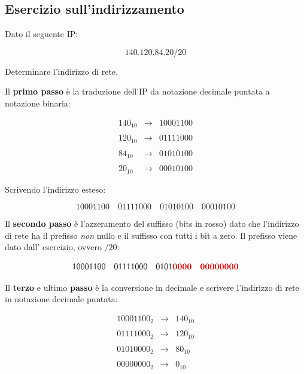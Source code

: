 \documentclass[a4paper]{article}
\newcommand{\binaryaddress}[4]{#1 \hspace{1em} #2 \hspace{1em} #3 \hspace{1em} #4}
\begin{document}
	\newpage
	
	\subsection{\textcolor{Red3}{Esercizio sull'indirizzamento}}
	
	Dato il seguente IP:
	
	\begin{equation*}
		140.120.84.20/20
	\end{equation*}
	
	\noindent
	Determinare l’indirizzo di rete.\newline
	
	\noindent
	Il \textbf{primo passo} è la traduzione dell’IP da notazione decimale puntata a notazione binaria:
	
	\begin{equation*}
		\begin{array}{lll}
			140_{10}	& \longrightarrow & 10001100 \\
			&& \\
			120_{10}	& \longrightarrow & 01111000 \\
			&& \\
			84_{10}		& \longrightarrow & 01010100 \\
			&& \\
			20_{10}		& \longrightarrow & 00010100
		\end{array}
	\end{equation*}
	
	\noindent
	Scrivendo l’indirizzo esteso:
	
	\begin{equation*}
		\binaryaddress{10001100}{01111000}{01010100}{00010100}
	\end{equation*}

	\noindent
	Il \textbf{secondo passo} è l’azzeramento del suffisso (bits in rosso) dato che l’indirizzo di rete ha il prefisso \emph{non} nullo e il suffisso con tutti i bit a zero. Il prefisso viene dato dall’ esercizio, ovvero $/20$:
	
	\begin{equation*}
		\binaryaddress{10001100}{01111000}{0101\textcolor{Red3}{\boldsymbol{0000}}}{\textcolor{Red3}{\boldsymbol{00000000}}}
	\end{equation*}

	\noindent
	Il \textbf{terzo} e ultimo \textbf{passo} è la conversione in decimale e scrivere l’indirizzo di rete in notazione decimale puntata:
	
	\begin{equation*}
		\begin{array}{lll}
			10001100_{2}	& \longrightarrow & 140_{10} \\
			&& \\
			01111000_{2}	& \longrightarrow & 120_{10} \\
			&& \\
			01010000_{2}	& \longrightarrow & 80_{10} \\
			&& \\
			00000000_{2}	& \longrightarrow & 0_{10}
		\end{array}
	\end{equation*}
\end{document}
